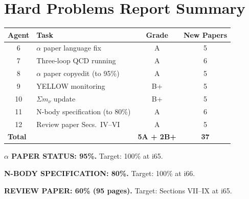 \documentclass[11pt,a4paper]{article}
\begin{document}
\section*{Hard Problems Report Summary}

\begin{center}
\begin{tabular}{clcc}
\toprule
\textbf{Agent} & \textbf{Task} & \textbf{Grade} & \textbf{New Papers} \\
\midrule
6 & $\alpha$ paper language fix & A & 5 \\
7 & Three-loop QCD running & A & 6 \\
8 & $\alpha$ paper copyedit (to 95\%) & A & 5 \\
9 & YELLOW monitoring & B+ & 5 \\
10 & $\Sigma m_\nu$ update & B+ & 5 \\
11 & N-body specification (to 80\%) & A & 6 \\
12 & Review paper Secs.\ IV--VI & A & 5 \\
\midrule
\multicolumn{2}{l}{\textbf{Total}} & \textbf{5A + 2B+} & \textbf{37} \\
\bottomrule
\end{tabular}
\end{center}

\textbf{$\alpha$ PAPER STATUS: 95\%.} Target: 100\% at i65.

\textbf{N-BODY SPECIFICATION: 80\%.} Target: 100\% at i66.

\textbf{REVIEW PAPER: 60\% (95 pages).} Target: Sections VII--IX at i65.
\end{document}
